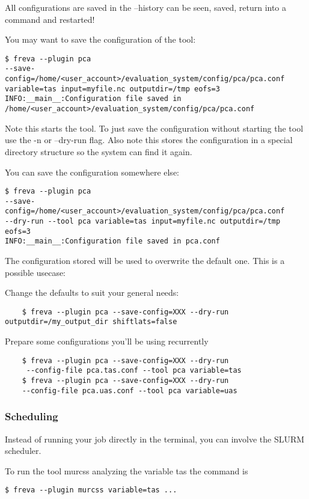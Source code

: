 \documentclass[a4paper,11pt]{ltxdoc}
\begin{document}
All configurations are saved in the --history can be seen, saved, return into a command and restarted!

You may want to save the configuration of the tool:
\begin{lstlisting}
$ freva --plugin pca 
--save-config=/home/<user_account>/evaluation_system/config/pca/pca.conf 
variable=tas input=myfile.nc outputdir=/tmp eofs=3 
INFO:__main__:Configuration file saved in 
/home/<user_account>/evaluation_system/config/pca/pca.conf
\end{lstlisting}

Note this starts the tool. To just save the configuration without starting the tool use the -n or --dry-run flag.
Also note this stores the configuration in a special directory structure so the system can find it again.

You can save the configuration somewhere else:
\begin{lstlisting}
$ freva --plugin pca 
--save-config=/home/<user_account>/evaluation_system/config/pca/pca.conf 
--dry-run --tool pca variable=tas input=myfile.nc outputdir=/tmp eofs=3
INFO:__main__:Configuration file saved in pca.conf
\end{lstlisting}
The configuration stored will be used to overwrite the default one. This is a possible usecase:

Change the defaults to suit your general needs:
\begin{lstlisting}
    $ freva --plugin pca --save-config=XXX --dry-run outputdir=/my_output_dir shiftlats=false
\end{lstlisting}
    Prepare some configurations you'll be using recurrently
\begin{lstlisting}
    $ freva --plugin pca --save-config=XXX --dry-run 
     --config-file pca.tas.conf --tool pca variable=tas
    $ freva --plugin pca --save-config=XXX --dry-run 
    --config-file pca.uas.conf --tool pca variable=uas
\end{lstlisting}

\subsubsection*{Scheduling}

Instead of running your job directly in the terminal, you can involve the SLURM scheduler.

To run the tool murcss analyzing the variable tas the command is
\begin{lstlisting}
$ freva --plugin murcss variable=tas ...
\end{lstlisting}
\end{document}
